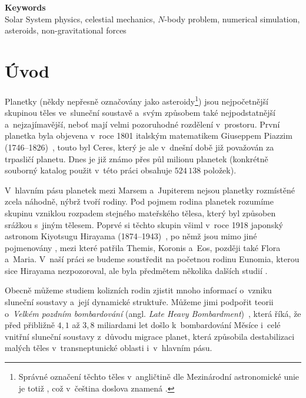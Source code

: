 \documentclass[A4paper, 12pt, oneside, openany]{book}
\begin{document}
{\large \bfseries Keywords}\\
Solar System physics, celestial mechanics, $N$-body problem, numerical simulation, asteroids, non-gravitational forces

\newpage

\tableofcontents

\newpage
\pagestyle{headings} %
\chapter*{Úvod} \label{ch:uvod} 
Planetky (někdy nepřesně označovány jako asteroidy\footnote{Správné označení těchto těles v~angličtině dle Mezinárodní astronomické unie je totiž , což v~čeština doslova znamená .}) jsou nejpočetnější skupinou těles ve~sluneční soustavě a~svým způsobem také nejpodstatnější a~nejzajímavější, neboť mají velmi pozoruhodné rozdělení v~prostoru. První planetka byla objevena v~roce 1801 italským matematikem Giuseppem Piazzim (1746--1826)~\cite{wiki:piazzi}, touto  byl Ceres, který je ale v~dnešní době již považován za trpasličí planetu. Dnes je již známo přes půl milionu planetek (konkrétně souborný katalog použit v~této práci \cite{astorb}\cite{knezevic12}\cite{nugent15}\cite{usui11}\cite{ivezic01} obsahuje $524\,138$ položek).

V~hlavním pásu planetek mezi Marsem a~Jupiterem nejsou planetky rozmístěné zcela náhodně, nýbrž tvoří rodiny. Pod pojmem rodina planetek rozumíme skupinu vzniklou rozpadem stejného mateřského tělesa, který byl způsoben srážkou s~jiným tělesem. Poprvé si těchto skupin všiml v~roce 1918 japonský astronom Kiyotsugu Hirayama (1874--1943)~\cite{wiki:hirayama}, po němž jsou mimo jiné pojmenovány , mezi které patřila Themis, Koronis a~Eos, později také Flora a~Maria. V~naší práci se budeme soustředit na početnou rodinu Eunomia, kterou sice Hirayama nezpozoroval, ale byla předmětem několika dalších studií \cite{nesvorny15} \cite{carruba16}.

Obecně můžeme studiem kolizních rodin zjistit mnoho informací o~vzniku sluneční soustavy a~její dynamické struktuře. Můžeme jimi podpořit teorii o~\textit{Velkém pozdním bombardování} (angl. \textit{Late Heavy Bombardment})~\cite{broz13}, která říká, že před přibližně $4,1$ až $3,8$ miliardami let došlo k~bombardování Měsíce i~celé vnitřní sluneční soustavy z~důvodu migrace planet, která způsobila destabilizaci malých těles v~transneptunické oblasti i~v~hlavním pásu.
\end{document}

